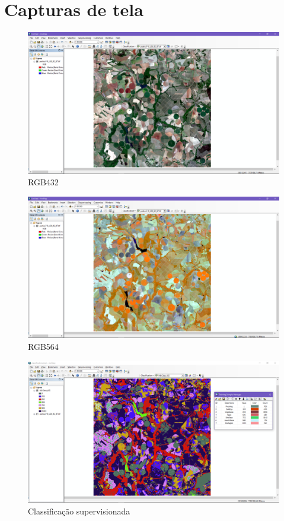 \documentclass[a4paper]{article}
\begin{document}
	\section{Capturas de tela}
	\begin{figure}[H]
		\centering
		\includegraphics[width=1\linewidth]{../images/print_432}
		\caption{RGB432}
	\end{figure}
	\begin{figure}[H]
		\centering
		\includegraphics[width=1\linewidth]{../images/print_564}
		\caption{RGB564}
	\end{figure}
	\begin{figure}[H]
		\centering
		\includegraphics[width=1\linewidth]{../images/print_classification}
		\caption{Classificação supervisionada}
	\end{figure}
	\newpage
\end{document}
